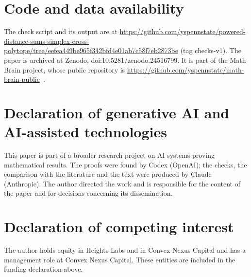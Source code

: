 \documentclass[11pt]{article}
\theoremstyle{remark}
\begin{document}
\section*{Code and data availability}
The check script and its output are at \url{https://github.com/yspennstate/powered-distance-sums-simplex-cross-polytope/tree/eefea449be965f342bfd4e01ab7c58f7eb2873be} (tag checks-v1). The paper is archived at Zenodo, doi:10.5281/zenodo.24516799. It is part of the Math Brain project, whose public repository is \url{https://github.com/yspennstate/math-brain-public}~\cite{MathBrainRepo}.

\section*{Declaration of generative AI and AI-assisted technologies}
This paper is part of a broader research project on AI systems proving mathematical results. The proofs were found by Codex (OpenAI); the checks, the comparison with the literature and the text were produced by Claude (Anthropic). The author directed the work and is responsible for the content of the paper and for decisions concerning its dissemination.

\section*{Declaration of competing interest}
The author holds equity in Heights Labs and in Convex Nexus Capital and has a management role at Convex Nexus Capital. These entities are included in the funding declaration above.

\appendix
\end{document}
